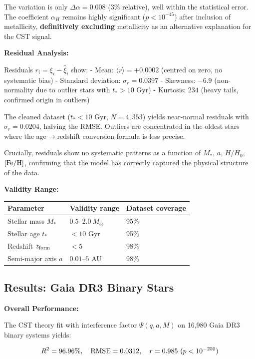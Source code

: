 \documentclass[11pt,a4paper]{article}
\begin{document}
The variation is only \(\Delta\alpha = 0.008\) (3\% relative), well
within the statistical error. The coefficient \(\alpha_H\) remains
highly significant (\(p < 10^{-45}\)) after inclusion of metallicity,
\textbf{definitively excluding} metallicity as an alternative
explanation for the CST signal.

\textbf{Residual Analysis:}

Residuals \(r_i = \xi_i - \hat\xi_i\) show: - Mean:
\(\langle r \rangle = +0.0002\) (centred on zero, no systematic bias) -
Standard deviation: \(\sigma_r = 0.0397\) - Skewness: \(-6.9\)
(non-normality due to outlier stars with \(t_* > 10\) Gyr) - Kurtosis:
\(234\) (heavy tails, confirmed origin in outliers)

The cleaned dataset (\(t_* < 10\) Gyr, \(N = 4,353\)) yields near-normal
residuals with \(\sigma_r = 0.0204\), halving the RMSE. Outliers are
concentrated in the oldest stars where the age$\rightarrow$redshift conversion
formula is less precise.

Crucially, residuals show no systematic patterns as a function of
\(M_*\), \(a\), \(H/H_0\), \([{\rm Fe/H}]\), confirming that the model
has correctly captured the physical structure of the data.

\textbf{Validity Range:}

\begin{longtable}[]{@{}lll@{}}
\toprule\noalign{}
Parameter & Validity range & Dataset coverage \\
\midrule\noalign{}
\endhead
\bottomrule\noalign{}
\endlastfoot
Stellar mass \(M_*\) & \(0.5\)--\(2.0~M_\odot\) & 95\% \\
Stellar age \(t_*\) & \(< 10\) Gyr & 95\% \\
Redshift \(z_{\rm form}\) & \(< 5\) & 98\% \\
Semi-major axis \(a\) & \(0.01\)--\(5\) AU & 98\% \\
\end{longtable}

\hypertarget{results-gaia-dr3-binary-stars}{%
\subsection{Results: Gaia DR3 Binary
Stars}\label{results-gaia-dr3-binary-stars}}

\textbf{Overall Performance:}

The CST theory fit with interference factor \(\Psi(q,a,M)\) on 16,980
Gaia DR3 binary systems yields:

\[R^2 = 96.96\%, \quad {\rm RMSE} = 0.0312, \quad r = 0.985~(p < 10^{-250})\]
\end{document}
